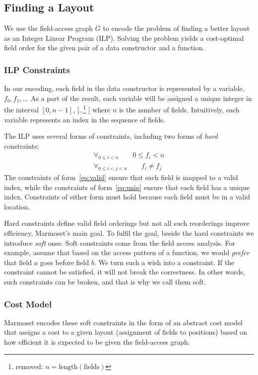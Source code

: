 \documentclass[acmsmall,review,anonymous]{acmart}\settopmatter{printfolios=true,printccs=false,printacmref=false}
\newcommand{\system}{{\sc Marmoset}\xspace}
\providecommand{\DIFaddtex}[1]{{\protect\color{blue} \sf #1}} %
\providecommand{\DIFdeltex}[1]{{\protect\color{red} [..\footnote{removed: #1} ]}} %
\providecommand{\DIFaddbegin}{} %
\providecommand{\DIFaddend}{} %
\providecommand{\DIFdelbegin}{} %
\providecommand{\DIFdelend}{} %
\providecommand{\DIFadd}[1]{\texorpdfstring{\DIFaddtex{#1}}{#1}} %
\providecommand{\DIFdel}[1]{\texorpdfstring{\DIFdeltex{#1}}{}} %
\newcommand{\DIFscaledelfig}{0.5}
\newlength{\DIFdelgraphicswidth} %
\newlength{\DIFdelgraphicsheight} %
\newcommand{\DIFaddincludegraphics}[2][]{{\color{blue}\fbox{\DIFOincludegraphics[#1]{#2}}}} %
\newcommand{\DIFdelincludegraphics}[2][]{%
\sbox{\DIFdelgraphicsbox}{\DIFOincludegraphics[#1]{#2}}%
\settoboxwidth{\DIFdelgraphicswidth}{\DIFdelgraphicsbox} %
\settoboxtotalheight{\DIFdelgraphicsheight}{\DIFdelgraphicsbox} %
\scalebox{\DIFscaledelfig}{%
\parbox[b]{\DIFdelgraphicswidth}{\usebox{\DIFdelgraphicsbox}\\[-\baselineskip] \rule{\DIFdelgraphicswidth}{0em}}\llap{\resizebox{\DIFdelgraphicswidth}{\DIFdelgraphicsheight}{%
\setlength{\unitlength}{\DIFdelgraphicswidth}%
\begin{picture}(1,1)%
\thicklines\linethickness{2pt} %
{\color[rgb]{1,0,0}\put(0,0){\framebox(1,1){}}}%
{\color[rgb]{1,0,0}\put(0,0){\line( 1,1){1}}}%
{\color[rgb]{1,0,0}\put(0,1){\line(1,-1){1}}}%
\end{picture}%
}\hspace*{3pt}}} %
} %
\DeclareRobustCommand{\DIFaddbegin}{\DIFOaddbegin \let\includegraphics\DIFaddincludegraphics} %
\DeclareRobustCommand{\DIFaddend}{\DIFOaddend \let\includegraphics\DIFOincludegraphics} %
\DeclareRobustCommand{\DIFdelbegin}{\DIFOdelbegin \let\includegraphics\DIFdelincludegraphics} %
\DeclareRobustCommand{\DIFdelend}{\DIFOaddend \let\includegraphics\DIFOincludegraphics} %
\begin{document}
\subsection{Finding a Layout}
\label{design:genconstraints}





We use the field-access graph $G$ to encode the problem of finding a better layout as an Integer Linear Program (ILP). Solving the problem yields a cost-optimal field order for the given pair of a data constructor and a function.

\subsubsection{ILP Constraints}
In our encoding, each field in the data constructor is represented by a variable, $f_0, f_1, \dots$ As a part of the result, each variable will be assigned a unique integer in the interval $[0, n -1]$, \DIFdelbegin \DIFdel{$n=\text{length}(\text{fields})$}\DIFdelend \DIFaddbegin \DIFadd{where $n$ is the number of fields}\DIFaddend . Intuitively, each variable represents an index in the sequence of fields.

The ILP uses several forms of constraints, including two forms of \emph{hard} constraints:
\begin{gather}
  \forall_{0 \leq i < n}  \qquad 0 \leqslant f_{i}  < n \label{eq:valid}\\
  \forall_{0 \leq i < j < n} \qquad f_i \neq f_j   \label{eq:uniq}
\end{gather}
The constraints of form~\ref{eq:valid} ensure that each field is mapped to a valid index, while the constraints of form~\ref{eq:uniq} ensure that each field has a unique index.
Constraints of either form must hold because each field must be in a valid location.

Hard constraints define valid field orderings but not all such reorderings improve efficiency, \system's main goal.
To fulfil the goal, beside the hard constraints we introduce {\em soft} ones. Soft constraints come from the field access analysis. For example, assume that based on the access pattern of a function, we would {\em prefer} that field $a$ goes before field $b$. We turn such a wish into a constraint. If the constraint cannot be satisfied, it will not break the correctness. In other words, such constraints can be broken, and that is why we call them soft.

\subsubsection{Cost Model}
\system encodes these soft constraints in the form of an abstract cost model that assigns a cost to a given layout (assignment of fields to positions) based on how efficient it is expected to be given the field-access graph.
\end{document}
